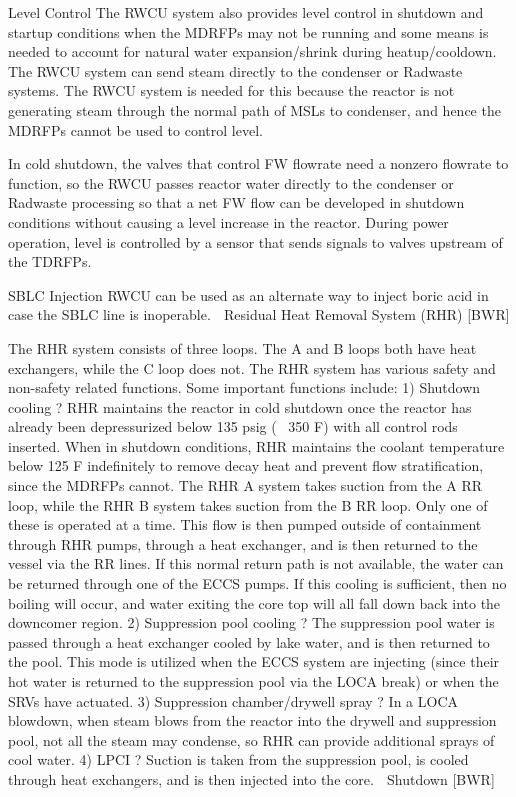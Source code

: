 \documentclass[10pt]{article}
\begin{document}
Level Control
The RWCU system also provides level control in shutdown and startup conditions when the MDRFPs may not be running and some means is needed to account for natural water expansion/shrink during heatup/cooldown. The RWCU system can send steam directly to the condenser or Radwaste systems. The RWCU system is needed for this because the reactor is not generating steam through the normal path of MSLs to condenser, and hence the MDRFPs cannot be used to control level. 

In cold shutdown, the valves that control FW flowrate need a nonzero flowrate to function, so the RWCU passes reactor water directly to the condenser or Radwaste processing so that a net FW flow can be developed in shutdown conditions without causing a level increase in the reactor. During power operation, level is controlled by a sensor that sends signals to valves upstream of the TDRFPs. 

SBLC Injection
RWCU can be used as an alternate way to inject boric acid in case the SBLC line is inoperable. 

Residual Heat Removal System (RHR) [BWR]

The RHR system consists of three loops. The A and B loops both have heat exchangers, while the C loop does not. The RHR system has various safety and non-safety related functions. Some important functions include:
1)	Shutdown cooling ? RHR maintains the reactor in cold shutdown once the reactor has already been depressurized below 135 psig (~ 350 F) with all control rods inserted. When in shutdown conditions, RHR maintains the coolant temperature below 125 F indefinitely to remove decay heat and prevent flow stratification, since the MDRFPs cannot. The RHR A system takes suction from the A RR loop, while the RHR B system takes suction from the B RR loop. Only one of these is operated at a time. This flow is then pumped outside of containment through RHR pumps, through a heat exchanger, and is then returned to the vessel via the RR lines. If this normal return path is not available, the water can be returned through one of the ECCS pumps. If this cooling is sufficient, then no boiling will occur, and water exiting the core top will all fall down back into the downcomer region. 
2)	Suppression pool cooling ? The suppression pool water is passed through a heat exchanger cooled by lake water, and is then returned to the pool. This mode is utilized when the ECCS system are injecting (since their hot water is returned to the suppression pool via the LOCA break) or when the SRVs have actuated. 
3)	Suppression chamber/drywell spray ? In a LOCA blowdown, when steam blows from the reactor into the drywell and suppression pool, not all the steam may condense, so RHR can provide additional sprays of cool water. 
4)	LPCI ? Suction is taken from the suppression pool, is cooled through heat exchangers, and is then injected into the core. 

Shutdown [BWR]
\end{document}
